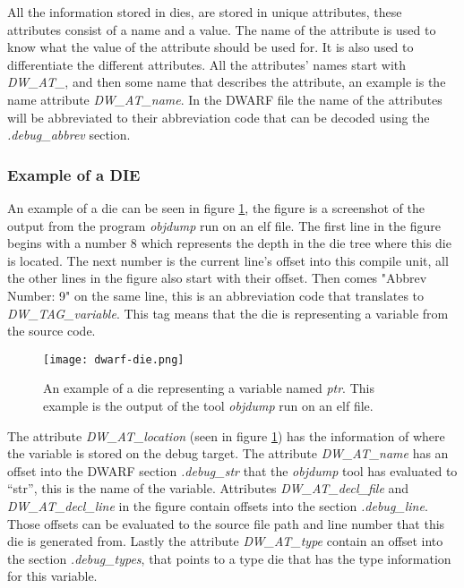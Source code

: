 

All the information stored in \glspl{die}, are stored in unique attributes, these attributes consist of a name and a value.
The name of the attribute is used to know what the value of the attribute should be used for.
It is also used to differentiate the different attributes.
All the attributes' names start with \emph{DW\_AT\_}, and then some name that describes the attribute, an example is the name attribute \emph{DW\_AT\_name}.
In the \gls{DWARF} file the name of the attributes will be abbreviated to their abbreviation code that can be decoded using the \emph{.debug\_abbrev} section.


\subsubsection{Example of a DIE}
An example of a \gls{die} can be seen in figure \ref{fig:dwarfdie}, the figure is a screenshot of the output from the program \emph{objdump} run on an \gls{elf} file.
The first line in the figure begins with a number $8$ which represents the depth in the \gls{die} tree where this \gls{die} is located.
The next number is the current line's offset into this compile unit, all the other lines in the figure also start with their offset.
Then comes "Abbrev Number: 9" on the same line, this is an abbreviation code that translates to \emph{DW\_TAG\_variable}.
This tag means that the \gls{die} is representing a variable from the source code.


\begin{figure}[h]
	\centering
	\texttt{[image: dwarf-die.png]}
	\caption{An example of a \gls{die} representing a variable named \emph{ptr}. This example is the output of the tool \emph{objdump} run on an \gls{elf} file.}
	\label{fig:dwarfdie}
\end{figure}


The attribute \emph{DW\_AT\_location} (seen in figure \ref{fig:dwarfdie}) has the information of where the variable is stored on the debug target.
The attribute \emph{DW\_AT\_name} has an offset into the \gls{DWARF} section \emph{.debug\_str} that the \emph{objdump} tool has evaluated to ``str'', this is the name of the variable.
Attributes \emph{DW\_AT\_decl\_file} and \emph{DW\_AT\_decl\_line} in the figure contain  offsets into the section \emph{.debug\_line}.
Those offsets can be evaluated to the source file path and line number that this \gls{die} is generated from.
Lastly the attribute \emph{DW\_AT\_type} contain an offset into the section \emph{.debug\_types}, that points to a type \gls{die} that has the type information for this variable.



